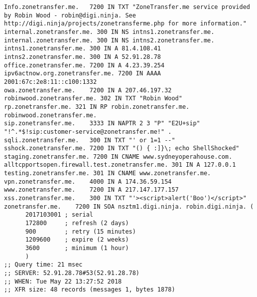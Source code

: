 \documentclass[11pt]{article}
\begin{document}
\begin{lstlisting}
Info.zonetransfer.me.	7200 IN	TXT "ZoneTransfer.me service provided by Robin Wood - robin@digi.ninja. See http://digi.ninja/projects/zonetransferme.php for more information."
internal.zonetransfer.me. 300 IN NS intns1.zonetransfer.me.
internal.zonetransfer.me. 300 IN NS intns2.zonetransfer.me.
intns1.zonetransfer.me.	300 IN A 81.4.108.41
intns2.zonetransfer.me.	300 IN A 52.91.28.78
office.zonetransfer.me.	7200 IN	A 4.23.39.254
ipv6actnow.org.zonetransfer.me.	7200 IN	AAAA 2001:67c:2e8:11::c100:1332
owa.zonetransfer.me.	7200 IN	A 207.46.197.32
robinwood.zonetransfer.me. 302 IN TXT "Robin Wood"
rp.zonetransfer.me.	321 IN RP robin.zonetransfer.me. robinwood.zonetransfer.me.
sip.zonetransfer.me.	3333 IN	NAPTR 2 3 "P" "E2U+sip" "!^.*$!sip:customer-service@zonetransfer.me!" .
sqli.zonetransfer.me.	300 IN TXT "' or 1=1 --"
sshock.zonetransfer.me.	7200 IN	TXT "() { :]}\; echo ShellShocked"
staging.zonetransfer.me. 7200 IN CNAME www.sydneyoperahouse.com.
alltcpportsopen.firewall.test.zonetransfer.me. 301 IN A	127.0.0.1
testing.zonetransfer.me. 301 IN	CNAME www.zonetransfer.me.
vpn.zonetransfer.me.	4000 IN	A 174.36.59.154
www.zonetransfer.me.	7200 IN	A 217.147.177.157
xss.zonetransfer.me.	300 IN TXT "'><script>alert('Boo')</script>"
zonetransfer.me.	7200 IN	SOA nsztm1.digi.ninja. robin.digi.ninja. (
      2017103001 ; serial
      172800     ; refresh (2 days)
      900        ; retry (15 minutes)
      1209600    ; expire (2 weeks)
      3600       ; minimum (1 hour)
      )
;; Query time: 21 msec
;; SERVER: 52.91.28.78#53(52.91.28.78)
;; WHEN: Tue May 22 13:27:52 2018
;; XFR size: 48 records (messages 1, bytes 1878)
\end{lstlisting}
\end{document}
